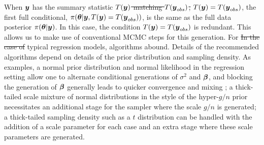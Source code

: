 \documentclass[11pt]{article}
\def\bth{\mbox{\boldmath $\theta$}}
\def\bbeta{\mbox{\boldmath $\beta$}}
\newcommand{\by}{\mbox{\boldmath $y$}}
\newcommand{\red}[1]{{\color{red}#1}}
\newcommand{\green}[1]{{\color{green}#1}}
\begin{document}
When $\by$ has the summary statistic \sout{$T(\by)$ matching $T(\by_{obs})$,} \green{$T(\by) = T(\by_{obs})$,}
the first full conditional, $\pi(\bth|\by, T(\by)=T(\by_{obs}))$, is
\red{the same as} the full data posterior
$\pi(\bth|\by)$. 
\green{In this case, the condition $T(\by) = T(\by_{obs})$ is redundant.  This allows us to make use of conventional MCMC steps for this generation.  For} 
\sout{In the case of} typical regression models, algorithms abound.  Details of the \green{recommended} algorithms depend on details of
the prior distribution and sampling density.  As examples, a normal
prior distribution and normal likelihood in the regression setting
allow one to alternate conditional generations of $\sigma^2$ and $\bbeta$, and blocking the generation of $\bbeta$ generally
leads to quicker convergence and mixing \citep{liu1994}; a thick-tailed scale mixture of normal distributions
in the style of the 
hyper-$g/n$ prior \citep{liang2008} necessitates an additional stage for the sampler where the scale 
$g/n$ is generated; a thick-tailed sampling density such as a $t$ distribution can be handled with the addition of 
a scale parameter for each case and an extra stage where these scale parameters are generated.  
\end{document}
